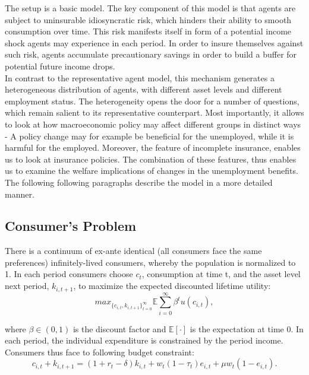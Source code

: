 \documentclass[a4paper,12pt]{article}
\begin{document}
The setup is a basic \cite{aiyagari} model. The key component of this model is that agents are subject to uninsurable idiosyncratic risk, which hinders their ability to smooth consumption over time. This risk manifests itself in form of a potential income shock agents may experience in each period. In order to insure themselves against such risk, agents accumulate precautionary savings in order to build a buffer for potential future income drops. \\
In contrast to the representative agent model, this mechanism generates a heterogeneous distribution of agents, with different asset levels and different employment status. The heterogeneity opens the door for a number of questions, which remain salient to its representative counterpart. Most importantly, it allows to look at how macroeconomic policy may affect different groups in distinct ways - A policy change may for example be beneficial for the unemployed, while it is harmful for the employed. Moreover, the feature of incomplete insurance, enables us to look at insurance policies. The combination of these features, thus enables us to examine the welfare implications of changes in the unemployment benefits.\\
The following following paragraphs describe the model in a more detailed manner. 

\subsection{Consumer's Problem}

There is a continuum of ex-ante identical (all consumers face the same preferences) infinitely-lived consumers, whereby the population is normalized to 1. In each period consumers choose $ c_{t}$, consumption at time t, and the asset level next period, $k_{i,t+1}$, to maximize the expected discounted lifetime utility: 
\[ 
 max_{\{{ c_{i,t}, k_{i,t+1} }\}_{t = 0}^{\infty}} {\mathbb{E}} \sum_{i=0}^{\infty} \beta^{t}  u(c_{i,t}), 
 \]

where $\beta \in (0,1)$ is the discount factor and $\mathbb{E[\cdot]}$ is the expectation at time 0. In each period, the individual expenditure is constrained by the period income. Consumers thus face to following budget constraint: 
  \begin{equation}
  \label{eq:budconstraint}
  c_{i,t} + k_{i,t+1} = (1 + r_{t} - \delta) k_{i,t} + w_{t} (1 - \tau_{t})  e_{i,t} + \mu w_{t} (1 - e_{i,t}).
 \end{equation} 
\end{document}
